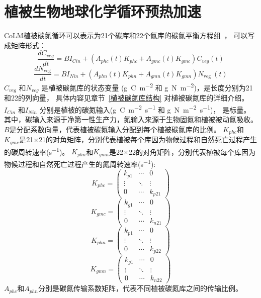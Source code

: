 \section{植被生物地球化学循环预热加速}
CoLM植被碳氮循环可以表示为21个碳库和22个氮库的碳氮平衡方程组~\citep{lu2020full}，
可以写成矩阵形式：
\begin{equation}
\frac{d C_{veg}}{dt}=B I_{Cin}+\left(A_{p h c}(t) K_{p h c}+A_{gmc}(t) K_{gmc}\right) C_{veg}(t)
\end{equation}
\begin{equation}
\frac{d N_{\text {veg}}}{dt}=B I_{Nin}+\left(A_{phn}(t) K_{phn}+A_{gmn}(t) K_{gmn}\right) N_{\text {veg }}(t)
\end{equation}
$C_{veg}$ 和$N_{veg}$ 是植被碳氮库的状态变量 (\unit{g.C.m^{-2}} 和 \unit{g.N.m^{-2}})，是长度分别为21和22的列向量，
具体内容见章节~\ref{植被碳氮库结构} 对植被碳氮库的详细介绍。$I_{Cin}$ 和$I_{Nin}$ 分别是植被的碳氮输入(\unit{g.C.m^{-2}.s^{-1}} 和 \unit{g.N.m^{-2}.s^{-1}})，
是标量。其中，碳输入来源于净第一性生产力，氮输入来源于生物固氮和植被被动氮吸收。
$B$是分配系数向量，代表植被碳氮输入分配到每个植被碳氮库的比例。  
$K_{phc}$和$K_{gmc}$是21$\times$21的对角矩阵，分别代表植被每个库因为物候过程和自然死亡过程产生的碳周转速率(\unit{s^{-1}})。
$K_{phn}$和$K_{gmn}$是22$\times$22的对角矩阵，分别代表植被每个库因为物候过程和自然死亡过程产生的氮周转速率(\unit{s^{-1}}):
\begin{equation}
K_{p h c}=\left(\begin{array}{ccc}k_{p 1} & \cdots & 0 \\ \vdots & \ddots & \vdots \\ 0 & \cdots & k_{p 21}\end{array}\right)
\end{equation}
\begin{equation}
K_{gmc}=\left(\begin{array}{ccc}k_{g 1} & \cdots & 0 \\ \vdots & \ddots & \vdots \\ 0 & \cdots & k_{n 21}\end{array}\right)
\end{equation}
\begin{equation}
K_{phn}=\left(\begin{array}{ccc}k_{p 1} & \cdots & 0 \\ \vdots & \ddots & \vdots \\ 0 & \cdots & k_{p 22}\end{array}\right)
\end{equation}
\begin{equation}
K_{gmn}=\left(\begin{array}{ccc}k_{g 1} & \cdots & 0 \\ \vdots & \ddots & \vdots \\ 0 & \cdots & k_{n 22}\end{array}\right)
\end{equation}
$A_{phc}$和$A_{phn}$分别是碳氮传输系数矩阵，代表不同植被碳氮库之间的传输比例。

